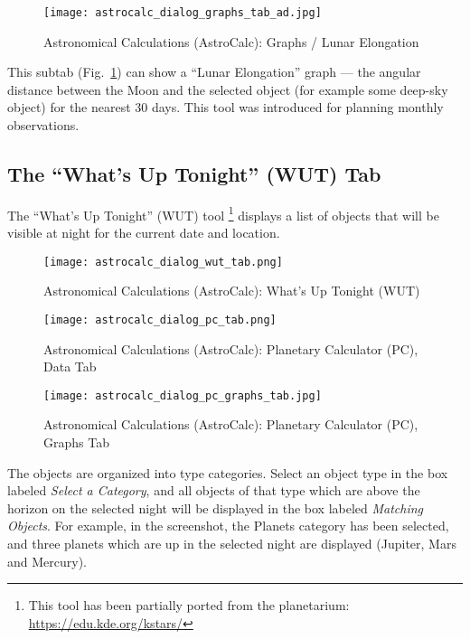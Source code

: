 \begin{figure}[p]
\centering\texttt{[image: astrocalc\_dialog\_graphs\_tab\_ad.jpg]}
\caption{Astronomical Calculations (AstroCalc): Graphs / Lunar Elongation}
\label{fig:gui:AstroCalc:Graphs:LE}
\end{figure}

This subtab (Fig.~\ref{fig:gui:AstroCalc:Graphs:LE})
 can show a ``Lunar Elongation''
graph --- the angular distance between the Moon
and the selected object (for example some deep-sky object) for the
nearest 30 days. This tool was introduced for planning monthly
observations.

\subsection{The ``What's Up Tonight'' (WUT) Tab}
\label{sec:gui:AstroCalc:WUT}

The ``What's Up Tonight'' (WUT) tool%
	\footnote{This tool has been partially ported from the  planetarium: \url{https://edu.kde.org/kstars/}}
 displays a list of objects that will be visible at night for the current date and location.

\begin{figure}[p]
\centering\texttt{[image: astrocalc\_dialog\_wut\_tab.png]}
\caption{Astronomical Calculations (AstroCalc): What's Up Tonight (WUT)}
\label{fig:gui:AstroCalc:WUT}
\end{figure}

\begin{figure}[p]
\centering\texttt{[image: astrocalc\_dialog\_pc\_tab.png]}
\caption{Astronomical Calculations (AstroCalc): Planetary Calculator (PC), Data Tab}
\label{fig:gui:AstroCalc:PC:Data}
\end{figure}
\begin{figure}[p]
\centering\texttt{[image: astrocalc\_dialog\_pc\_graphs\_tab.jpg]}
\caption{Astronomical Calculations (AstroCalc): Planetary Calculator (PC), Graphs Tab}
\label{fig:gui:AstroCalc:PC:Graphs}
\end{figure}

The objects are organized into type categories. Select an object type in the box labeled 
\emph{Select a Category}, and all objects of that type which are above the horizon on the selected night 
will be displayed in the box labeled \emph{Matching Objects}. For example, in the screenshot, 
the Planets category has been selected, and three planets which are up in the selected night are displayed (Jupiter, Mars and Mercury). 

